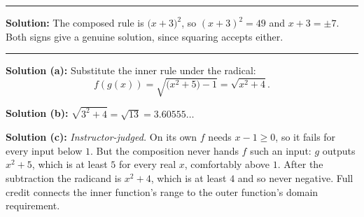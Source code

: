 \documentclass[12pt]{article}
\begin{document}
\vspace{0.2cm}\noindent\rule{\linewidth}{0.2pt}\vspace{0.2cm}


\textbf{Solution:} The composed rule is $\bigl(x+3\bigr)^2$, so
$(x+3)^2 = 49$ and $x + 3 = \pm 7$. Both signs give a genuine solution, since
squaring accepts either.

\vspace{0.2cm}\noindent\rule{\linewidth}{0.2pt}\vspace{0.2cm}


\textbf{Solution (a):} Substitute the inner rule under the radical:
\[ f(g(x)) = \sqrt{\bigl(x^2+5\bigr) - 1} = \sqrt{x^2+4} . \]

\textbf{Solution (b):} $\sqrt{3^2+4} = \sqrt{13} = 3.60555\ldots$ 

\textbf{Solution (c):} \emph{Instructor-judged.} On its own $f$ needs
$x - 1 \ge 0$, so it fails for every input below $1$. But the composition never
hands $f$ such an input: $g$ outputs $x^2+5$, which is at least $5$ for every
real $x$, comfortably above $1$. After the subtraction the radicand is $x^2+4$,
which is at least $4$ and so never negative. Full credit connects the inner
function's range to the outer function's domain requirement.
\end{document}
